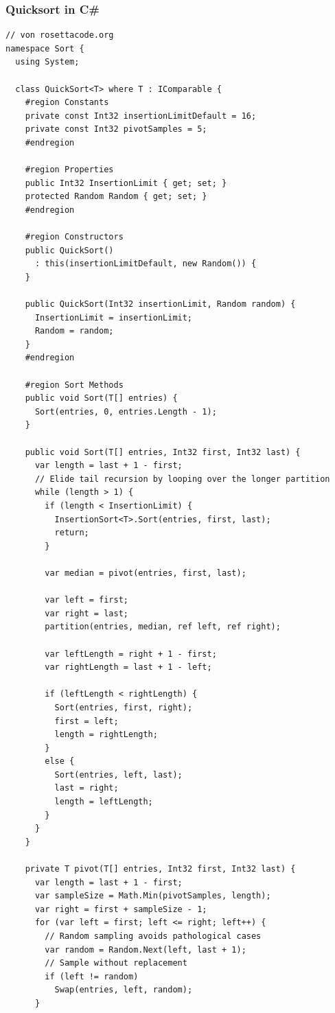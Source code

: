 \documentclass[12pt,compress,ngerman,utf8,t]{beamer}
\begin{document}
\begin{frame}[fragile]\frametitle{Quicksort in C\#}
  \tiny\vspace{-0.5em}
  \begin{verbatim}
// von rosettacode.org
namespace Sort {
  using System;
 
  class QuickSort<T> where T : IComparable {
    #region Constants
    private const Int32 insertionLimitDefault = 16;
    private const Int32 pivotSamples = 5;
    #endregion
 
    #region Properties
    public Int32 InsertionLimit { get; set; }
    protected Random Random { get; set; }
    #endregion
 
    #region Constructors
    public QuickSort()
      : this(insertionLimitDefault, new Random()) {
    }
 
    public QuickSort(Int32 insertionLimit, Random random) {
      InsertionLimit = insertionLimit;
      Random = random;
    }
    #endregion
 
    #region Sort Methods
    public void Sort(T[] entries) {
      Sort(entries, 0, entries.Length - 1);
    }
 
    public void Sort(T[] entries, Int32 first, Int32 last) {
      var length = last + 1 - first;
      // Elide tail recursion by looping over the longer partition
      while (length > 1) {
        if (length < InsertionLimit) {
          InsertionSort<T>.Sort(entries, first, last);
          return;
        }
 
        var median = pivot(entries, first, last);
 
        var left = first;
        var right = last;
        partition(entries, median, ref left, ref right);
 
        var leftLength = right + 1 - first;
        var rightLength = last + 1 - left;
 
        if (leftLength < rightLength) {
          Sort(entries, first, right);
          first = left;
          length = rightLength;
        }
        else {
          Sort(entries, left, last);
          last = right;
          length = leftLength;
        }
      }
    }
 
    private T pivot(T[] entries, Int32 first, Int32 last) {
      var length = last + 1 - first;
      var sampleSize = Math.Min(pivotSamples, length);
      var right = first + sampleSize - 1;
      for (var left = first; left <= right; left++) {
        // Random sampling avoids pathological cases
        var random = Random.Next(left, last + 1);
        // Sample without replacement
        if (left != random)
          Swap(entries, left, random);
      }
 

\end{verbatim}
\end{frame}
\end{document}
